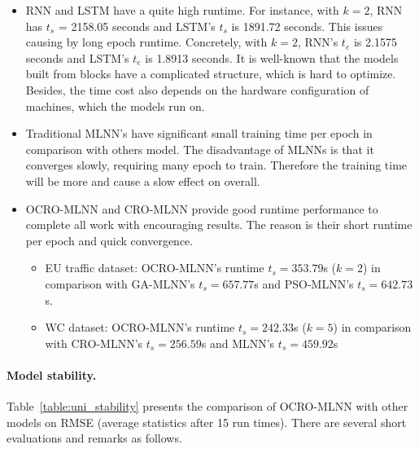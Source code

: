 \documentclass[11pt,twoside]{article}
\begin{document}
\begin{multicols}{2}
\begin{itemize}
\item RNN and LSTM have a quite high runtime. For instance, with $k = 2$, RNN has $t_s$ = 2158.05 seconds and LSTM's $t_s$ is 1891.72 seconds. This issues causing by long epoch runtime. Concretely, with $k = 2$, RNN's $t_e$ is 2.1575 seconds and LSTM's $t_e$ is 1.8913 seconds. It is well-known that the models built from blocks have a complicated structure, which is hard to optimize. Besides, the time cost also depends on the hardware configuration of machines, which the models run on.
\item Traditional MLNN's have significant small training time per epoch in comparison with others model. The disadvantage of MLNNs is that it converges slowly, requiring many epoch to train. Therefore the training time will be more and cause a slow effect on overall.
\item OCRO-MLNN and CRO-MLNN provide good runtime performance to complete all work with encouraging results. The reason is their short runtime per epoch and quick convergence.
	\begin{itemize}
		\item EU traffic dataset: OCRO-MLNN's runtime $t_s = 353.79$s ($k = 2$) in comparison with GA-MLNN's $t_s = 657.77$s and PSO-MLNN's $t_s = 642.73$s.
		\item WC dataset: OCRO-MLNN's runtime $t_s = 242.33$s ($k = 5$) in comparison with CRO-MLNN's $t_s = 256.59$s and MLNN's $t_s = 459.92$s
	\end{itemize}
\end{itemize}






\paragraph{\textbf{Model stability.}} Table~\ref{table:uni_stability} presents the comparison of OCRO-MLNN with other models on RMSE (average statistics after 15 run times). There are several short evaluations and remarks as follows.


\end{multicols}
\end{document}
